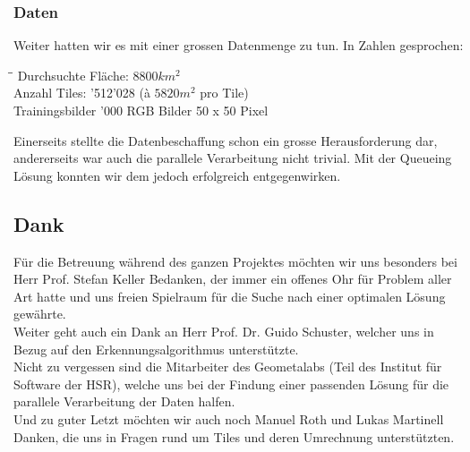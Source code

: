 \subsubsection{Daten}
Weiter hatten wir es mit einer grossen Datenmenge zu tun. In Zahlen gesprochen:
\begin{tabbing}
    \hspace*{8cm}\=\hspace*{4cm}\= \kill
    Durchsuchte Fläche: \> $8800 km^{2}$  \\
    Anzahl Tiles: '512'028 (à $5820 m^{2}$ pro Tile)\\
    Trainingsbilder '000 RGB Bilder 50 x 50 Pixel \\
\end{tabbing}
Einerseits stellte die Datenbeschaffung schon ein grosse Herausforderung dar, andererseits war auch die parallele Verarbeitung nicht trivial. Mit der Queueing Lösung konnten wir dem jedoch erfolgreich entgegenwirken.
\newpage
\subsection{Dank}
Für die Betreuung während des ganzen Projektes möchten wir uns besonders bei Herr Prof. Stefan Keller Bedanken, der immer ein offenes Ohr für Problem aller Art hatte und uns freien Spielraum für die Suche nach einer optimalen Lösung gewährte. \\
Weiter geht auch ein Dank an Herr Prof. Dr.  Guido Schuster, welcher uns in Bezug auf den Erkennungsalgorithmus unterstützte. \\
Nicht zu vergessen sind die Mitarbeiter des Geometalabs (Teil des Institut für Software der HSR), welche uns bei der Findung einer passenden Lösung für die parallele Verarbeitung der Daten halfen.\\
Und zu guter Letzt möchten wir auch noch Manuel Roth und Lukas Martinell Danken, die uns in Fragen rund um Tiles und deren Umrechnung unterstützten.
	

